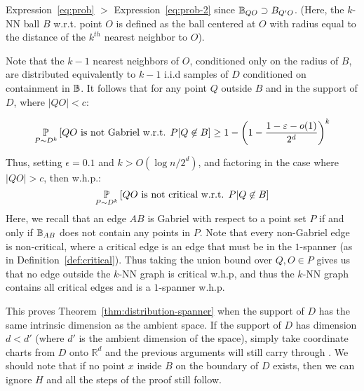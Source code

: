 Expression~\ref{eq:prob} $>$
Expression~\ref{eq:prob-2} since $\mathbb{B}_{QO} \supset B_{Q'O}$.
(Here, the $k$-NN ball $B$ w.r.t. point $O$ is defined as the ball
centered at $O$ with radius equal to the distance of the $k^{th}$
nearest neighbor to $O$).

Note that the $k-1$ nearest neighbors of $O$, conditioned only on
the radius of $B$, are distributed
equivalently to $k-1$ i.i.d samples of $D$ conditioned on containment
in $\mathbb{B}$. It follows
that for any point $Q$ outside $B$ and in the support of $D$,
where $|QO|< c$:
  
\begin{align}
  \operatorname*{\mathbb{P}}_{P \sim D^k}\left[ QO \text{ is not Gabriel w.r.t. $P$} | Q \not\in B \right]
  \geq 1- \left(1 - \frac{1-\varepsilon-o(1) }{2^d} \right)^k
\end{align}

Thus, setting $\epsilon = 0.1$ and $ k > O(\log n/2^d) $, and
factoring in the case where $|QO| > c$, then w.h.p.:
\[
  \operatorname*{\mathbb{P}}_{P \sim D^k}\left[ QO \text{ is not critical w.r.t. $P$} | Q \not\in B \right]
  \] 
Here, we recall that an edge $AB$ is Gabriel with respect to a
point set $P$ if and only if $\mathbb{B}_{AB}$ does not contain any points
in $P$. Note that every non-Gabriel edge is non-critical, where a
critical edge is an edge that must be in the $1$-spanner (as
in Definition~\ref{def:critical}).
 Thus taking the union bound over $Q, O \in P$ gives us that
no edge outside the $k$-NN graph is critical w.h.p, and thus the
$k$-NN graph contains all critical edges and is a $1$-spanner
w.h.p.

This proves Theorem~\ref{thm:distribution-spanner} when the
support of $D$ has the same intrinsic dimension as the ambient
space. If the support of $D$ has  dimension $d < d'$ (where $d'$
is the ambient dimension of the space), simply take coordinate charts from
$D$ onto $\mathbb{R}^d$ and the previous arguments will still
carry through
.
We should note that if no point $x$ inside $B$ on the boundary of
$D$ exists, then we can ignore $H$ and all the steps of
the proof still follow.
